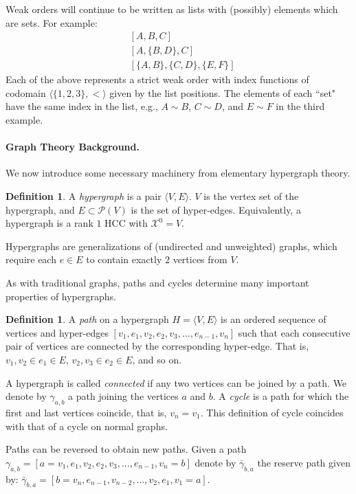 \documentclass{article}
\theoremstyle{plain}
\theoremstyle{definition}
\newtheorem{definition}[theorem]{Definition}
\theoremstyle{remark}
\newcommand{\cX}{\mathcal{X}}
\let\oldparagraph\paragraph
\renewcommand{\paragraph}[1]{%
	\vspace{-0.5em}%
	\oldparagraph{#1}%
}
\begin{document}
Weak orders will continue to be written as lists with (possibly) elements which are sets. For example:
\begin{equation*}
	\begin{aligned}
		&[A, B, C]\\
		&[A, \{B, D\}, C]\\
		&[\{A, B\}, \{C, D\}, \{E, F\}]
	\end{aligned}
\end{equation*}
Each of the above represents a strict weak order with index functions of codomain $\langle \{1, 2, 3\}, <\rangle$ given by the list positions. The elements of each ``set" have the same index in the list, e.g., $A \sim B$, $C \sim D$, and $E \sim F$ in the third example.

\paragraph{Graph Theory Background.}
We now introduce some necessary machinery from elementary hypergraph theory.
\begin{definition}
	A \textit{hypergraph} is a pair $\big\langle V, E \big\rangle$. $V$ is the vertex set of the hypergraph, and $E \subset \mathcal{P}(V)$ is the set of hyper-edges. Equivalently, a hypergraph is a rank $1$ HCC with $\cX^0 = V$.
	\vspace{-0.5em}
\end{definition}
Hypergraphs are generalizations of (undirected and unweighted) graphs, which require each $e \in E$ to contain exactly $2$ vertices from $V$.

As with traditional graphs, paths and cycles determine many important properties of hypergraphs.
\begin{definition}
	A \textit{path} on a hypergraph $H = \big\langle V, E \big\rangle$ is an ordered sequence of vertices and hyper-edges $[v_1, e_1, v_2, e_2, v_3, ...,  e_{n-1}, v_n]$ such that each consecutive pair of vertices are connected by the corresponding hyper-edge. That is, $v_1, v_2 \in e_1 \in E$, $v_2, v_3 \in e_2 \in E$, and so on.
\end{definition}
A hypergraph is called \textit{connected} if any two vertices can be joined by a path. We denote by $\gamma_{a,b}$ a path joining the vertices $a$ and $b$. A \textit{cycle} is a path for which the first and last vertices coincide, that is, $v_n = v_1$. This definition of cycle coincides with that of a cycle on normal graphs.

Paths can be reversed to obtain new paths. Given a path $\gamma_{a,b} = [a = v_1, e_1, v_2, e_2, v_3, ...,  e_{n-1}, v_n = b]$ denote by $\bar{\gamma}_{b,a}$ the reserve path given by: $\bar{\gamma}_{b,a} = [b = v_n, e_{n-1}, v_{n-2}, ...,  v_2, e_1, v_1 = a]$.
\end{document}
